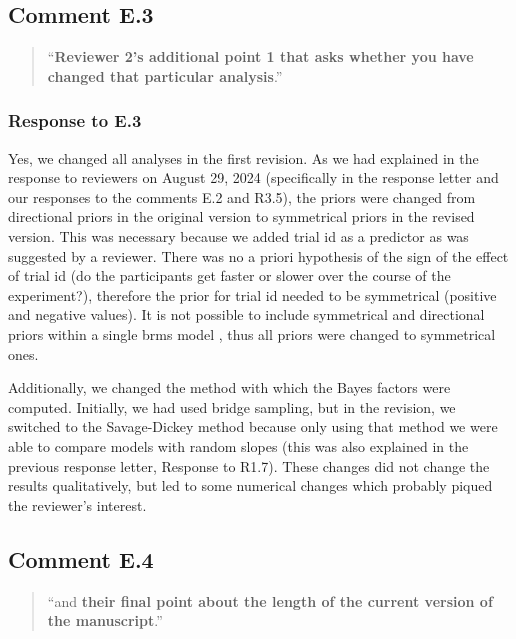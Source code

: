 \documentclass[12pt]{article}
\begin{document}
\begin{quote}
\end{quote}


\subsection*{Comment E.3}
\begin{quote}
``\textbf{Reviewer 2's additional point 1 that asks whether you have changed that particular analysis}.''
\end{quote}

\subsubsection*{Response to E.3}
Yes, we changed all analyses in the first revision. As we had explained in the response to reviewers on August 29, 2024 (specifically in the response letter and our responses to the comments E.2 and R3.5), the priors were changed from directional priors in the original version to symmetrical priors in the revised version. This was necessary because we added trial id as a predictor as was suggested by a reviewer. There was no a priori hypothesis of the sign of the effect of trial id (do the participants get faster or slower over the course of the experiment?), therefore the prior for trial id needed to be symmetrical (positive and negative values). It is not possible to include symmetrical and directional priors within a single brms model \citep{brms}, thus all priors were changed to symmetrical ones.

Additionally, we changed the method with which the Bayes factors were computed. Initially, we had used bridge sampling, but in the revision, we switched to the Savage-Dickey method because only using that method we were able to compare models with random slopes (this was also explained in the previous response letter, Response to R1.7). These changes did not change the results qualitatively, but led to some numerical changes which probably piqued the reviewer's interest.


\subsection*{Comment E.4}
\begin{quote}
``and \textbf{their final point about the length of the current version of the manuscript}.''
\end{quote}
\end{document}
